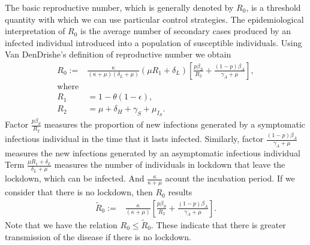 %
The basic reproductive number, which is generally denoted by $ R_0 $,
is a threshold quantity with which we can use 
particular control strategies. The epidemiological interpretation of 
$ R_0 $ is the average number of secondary cases produced by an infected
individual introduced into a population of susceptible individuals.
Using Van DenDrishe's \cite{VandenDriessche2017a} definition of reproductive number
we obtain
\begin{equation*}
    \label{eqn:reproductive_number}
    \begin{aligned}
        R_0 :=
        &
        \frac{\kappa}{(\kappa + \mu)(\delta_L + \mu)}
        \left(
           \mu R_1 + \delta_L
        \right)
        \left[
            \frac{p\beta_S}{R_2}
            +\frac{(1 - p) \beta_A}{\gamma_A+\mu}
        \right],
    \\
    \text{where} &
    \\
        R_1 &= 1 - \theta(1 - \epsilon),
    \\
        R_2 &= \mu + \delta_H + \gamma_S + \mu_{I_{S}}.
    \end{aligned}
\end{equation*}
%
Factor $\frac{p\beta_S}{R_2}$ measures the proportion of new infections
generated by a symptomatic infectious individual in the time that it lasts
infected. Similarly, factor $\frac{(1 - p) \beta_A}{\gamma_A+\mu}$
measures the new infections generated by an asymptomatic infectious individual
Term  
$
    \frac{\mu R_1 + \delta_L}{\delta_L + \mu}
$ measures the number of individuals in lockdown that leave the 
lockdown, which can be infected.
And $\frac{\kappa}{\kappa + \mu}$ acount
the incubation period.
%
If we consider that there is no lockdown, then  $ R_0 $ results
\begin{equation*}
    \label{eqn:reproductive_number}
    \begin{aligned}
        \tilde{R}_0 :=
        &
        \frac{\kappa}{(\kappa + \mu)}
        \left[
            \frac{p\beta_S}{R_2}
            +\frac{(1 - p) \beta_A}{\gamma_A+\mu}
        \right].
    \end{aligned}
\end{equation*}
%
Note that we have the relation $ R_0 \leq \tilde{R}_0 $. These indicate that there is greater transmission of the disease if there is no lockdown.
